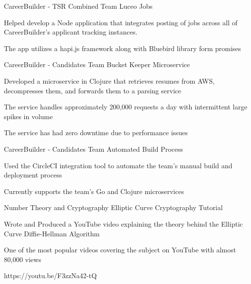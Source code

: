 \begin{cventries}
  \cventry
  	{CareerBuilder - TSR Combined Team} %
    {Luceo Jobs} %
    {} %
    {} %
    {
      \begin{cvitems} %
        \item {Helped develop a Node application that integrates posting of jobs across all of CareerBuilder's applicant tracking instances.}  
        \item {The app utilizes a hapi.js framework along with Bluebird library form promises}
      \end{cvitems}
    }

  \cventry
  	{CareerBuilder - Candidates Team} %
    {Bucket Keeper Microservice} %
    {} %
    {} %
    {
      \begin{cvitems} %
        \item {Developed a microservice in Clojure that retrieves resumes from AWS, decompresses them, and forwards them to a parsing service}  
        \item {The service handles approximately 200,000 requests a day with intermittent large spikes in volume}
        \item {The service has had zero downtime due to performance issues} 
      \end{cvitems}
    }

  \cventry
   	{CareerBuilder - Candidates Team} %
    {Automated Build Process} %
    {} %
    {} %
    {
      \begin{cvitems} %
        \item {Used the CircleCI integration tool to automate the team's manual build and deployment process}
        \item {Currently supports the team's Go and Clojure microservices}
    	\end{cvitems}
	}
    
    \cventry
    {Number Theory and Cryptography} %
    {Elliptic Curve Cryptography Tutorial} %
    {} %
    {} %
    {
      \begin{cvitems} %
        \item {Wrote and Produced a YouTube video explaining the theory behind the Elliptic Curve Diffie-Hellman Algorithm}
        \item {One of the most popular videos covering the subject on YouTube with almost 80,000 views}
        \item{https://youtu.be/F3zzNa42-tQ}
      \end{cvitems}
    }

\end{cventries}
